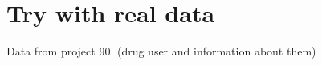 \documentclass[12pt]{report}
\begin{document}
\chapter{Try with real data}

Data from project 90. (drug user and information about them)
\end{document}
